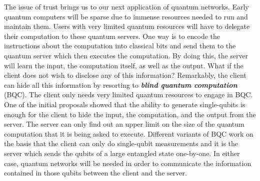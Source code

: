 The issue of trust brings us to our next application of quantum networks.
Early quantum computers will be sparse due to immense resources needed to run and maintain them.
Users with very limited quantum resources will have to delegate their computation to these quantum servers.
One way is to encode the instructions about the computation into classical bits and send them to the quantum server which then executes the computation.
By doing this, the server will learn the input, the computation itself, as well as the output.
What if the client does not wish to disclose any of this information?
Remarkably, the client can hide all this information by resorting to \textbf{\textit{blind quantum computation}} (BQC).
The client only needs very limited quantum resources to engage in BQC.
One of the initial proposals showed that the ability to generate single-qubits is enough for the client to hide the input, the computation, and the output from the server.
The server can only find out an upper limit on the size of the quantum computation that it is being asked to execute.
Different variants of BQC work on the basis that the client can only do single-qubit measurements and it is the server which sends the qubits of a large entangled state one-by-one.
In either case, quantum networks will be needed in order to communicate the information contained in those qubits between the client and the server.




\newpage
\begin{exercises}



\end{exercises}

